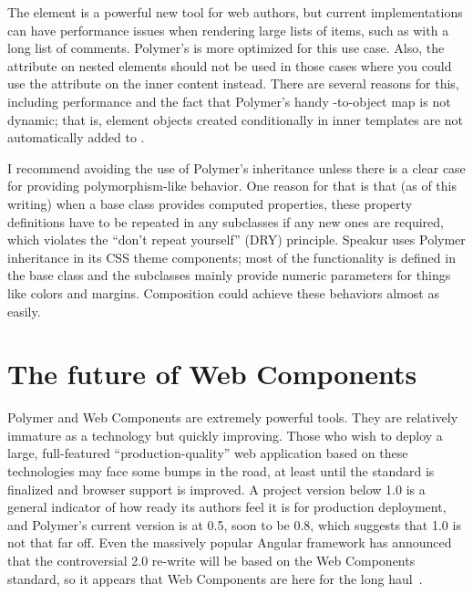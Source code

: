 The  element is a powerful new tool for web authors, 
but current implementations can have performance issues when rendering large lists of items, such as with a long list of comments. 
Polymer's  is more optimized for this use case.
Also, the  attribute on nested  elements should not be used in those cases where you could use the  attribute on the inner content instead.
There are several reasons for this, including performance and 
the fact that Polymer's handy  -to-object map is not dynamic; 
that is, element objects created conditionally in inner templates are not automatically added to .

I recommend avoiding the use of Polymer's inheritance unless there is a clear case for providing polymorphism-like behavior.
One reason for that is that (as of this writing) when a base class provides computed properties, 
these property definitions have to be repeated in any subclasses if any new ones are required,
which violates the ``don't repeat yourself'' (DRY) principle.
Speakur uses Polymer inheritance in its CSS theme components; 
most of the functionality is defined in the base class and the subclasses mainly provide numeric parameters for things like colors and margins.
Composition could achieve these behaviors almost as easily.


\section{The future of Web Components}

Polymer and Web Components are extremely powerful tools.
They are relatively immature as a technology but quickly improving.
Those who wish to deploy a large, full-featured ``prod\-uction-quality'' web application based on these technologies may face some bumps in the road, 
at least until the standard is finalized and browser support is improved.
A project version below 1.0 is a general indicator of how ready its authors feel it is for production deployment, and Polymer's current version is at 0.5, soon to be 0.8, 
which suggests that 1.0 is not that far off.
Even the massively popular Angular framework has announced that the controversial 2.0 re-write will be based on the Web Components standard,
so it appears that Web Components are here for the long haul~\cite{santiagoesteva2015}.

